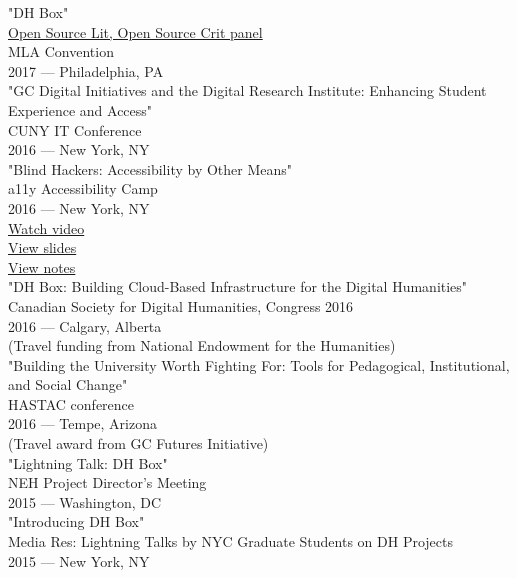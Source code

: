 \documentclass[11pt]{article}
\begin{document}
"DH Box"\\[0pt]
\href{https://text.mla.hcommons.org/}{Open Source Lit, Open Source Crit panel}\\[0pt]
MLA Convention\\[0pt]
2017 — Philadelphia, PA\\[0pt]

"GC Digital Initiatives and the Digital Research Institute: Enhancing Student Experience and Access"\\[0pt]
CUNY IT Conference\\[0pt]
2016 — New York, NY\\[0pt]

"Blind Hackers: Accessibility by Other Means"\\[0pt]
a11y Accessibility Camp\\[0pt]
2016 — New York, NY\\[0pt]
\href{https://www.youtube.com/watch?v=W8\_O3joo4aU}{Watch video}\\[0pt]
\href{http://htmlpreview.github.io/?https://github.com/smythp/blind-hackers/blob/master/presentation/foo.html}{View slides}\\[0pt]
\href{https://github.com/smythp/blind-hackers}{View notes}\\[0pt]

"DH Box: Building Cloud-Based Infrastructure for the Digital Humanities"\\[0pt]
Canadian Society for Digital Humanities, Congress 2016\\[0pt]
2016 — Calgary, Alberta\\[0pt]
(Travel funding from National Endowment for the Humanities)\\[0pt]

"Building the University Worth Fighting For: Tools for Pedagogical, Institutional, and Social Change"\\[0pt]
HASTAC conference\\[0pt]
2016 — Tempe, Arizona\\[0pt]
(Travel award from GC Futures Initiative)\\[0pt]

"Lightning Talk: DH Box"\\[0pt]
NEH Project Director's Meeting\\[0pt]
2015 — Washington, DC\\[0pt]

"Introducing DH Box"\\[0pt]
Media Res: Lightning Talks by NYC Graduate Students on DH Projects\\[0pt]
2015 — New York, NY\\[0pt]
\end{document}
